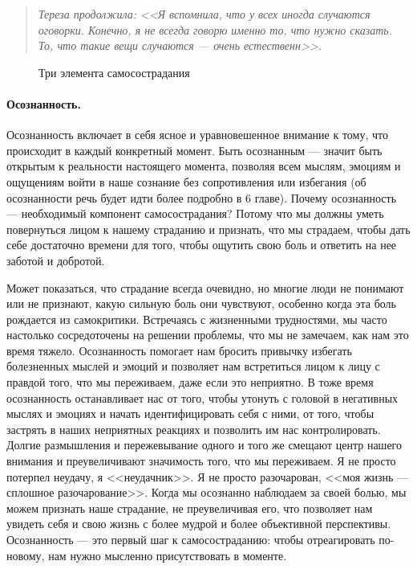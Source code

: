 \begin{quote}
	\textit{Тереза продолжила: <<Я вспомнила, что у всех иногда случаются оговорки. Конечно, я не всегда говорю именно то, что нужно сказать. То, что такие вещи случаются --- очень естественн>>.} 
\end{quote}

\begin{figure}[h]
	\begin{center}
		
		\caption{Три элемента самосострадания}
	\end{center}
\end{figure}

\paragraph{Осознанность.} Осознанность включает в себя ясное и уравновешенное внимание к тому, что происходит в каждый конкретный момент. Быть осознанным --- значит быть открытым к реальности настоящего момента, позволяя всем мыслям, эмоциям и ощущениям войти в наше сознание без сопротивления или избегания (об осознанности речь будет идти более подробно в 6 главе). 
Почему осознанность --- необходимый компонент самосострадания? Потому что мы должны уметь повернуться лицом к нашему страданию и признать, что мы страдаем, чтобы дать себе достаточно времени для того, чтобы ощутить свою боль и ответить на нее заботой и добротой.
 
Может показаться, что страдание всегда очевидно, но многие люди не понимают или не признают, какую сильную боль они чувствуют, особенно когда эта боль рождается из самокритики. Встречаясь с жизненными трудностями, мы часто настолько сосредоточены на решении проблемы, что мы не замечаем, как нам  это время тяжело. Осознанность помогает нам бросить привычку избегать болезненных мыслей и эмоций и позволяет нам встретиться лицом к лицу с правдой того, что мы переживаем, даже если это неприятно. В тоже время осознанность останавливает нас от того, чтобы утонуть с головой в негативных мыслях и эмоциях и начать идентифицировать себя с ними, от того, чтобы застрять в наших неприятных реакциях и позволить им нас контролировать. Долгие размышления и пережевывание одного и того же смещают центр нашего внимания и преувеличивают значимость того, что мы переживаем. Я не просто потерпел неудачу, я <<неудачник>>. Я не просто разочарован, <<моя жизнь --- сплошное разочарование>>. Когда мы осознанно наблюдаем за своей болью, мы можем признать наше страдание, не преувеличивая его, что позволяет нам увидеть себя и свою жизнь с более мудрой и более объективной перспективы. Осознанность --- это первый шаг к самосостраданию: чтобы отреагировать по-новому, нам нужно мысленно присутствовать в моменте.
 
